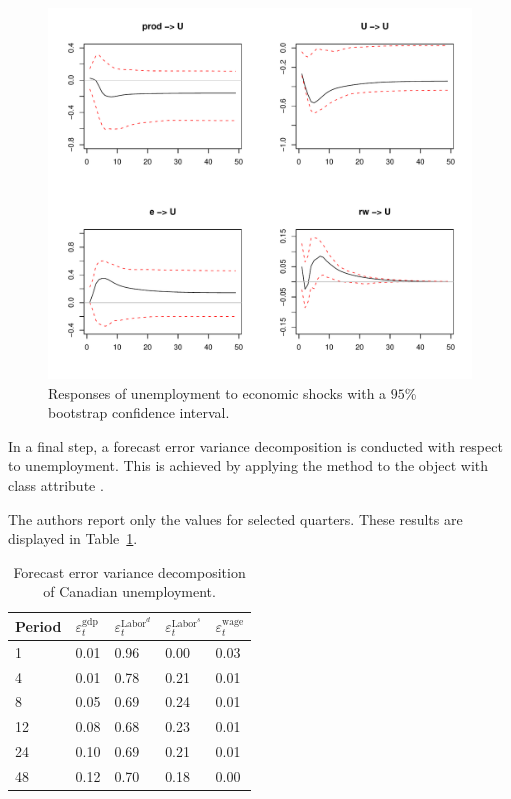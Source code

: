 \documentclass[nojss]{jss}
\begin{document}
\begin{figure}[t!]
\centering  
\includegraphics{Figures/fig-5}
\caption{Responses of unemployment to economic shocks with a $95$\%
  bootstrap confidence interval.}
\label{fig-5}
\end{figure}

In a final step, a forecast error variance decomposition is conducted
with respect to unemployment. This is achieved by applying the
 method to the object with class attribute .
\begin{Schunk}
\end{Schunk}
The authors report only the values for selected quarters. These
results are displayed in Table~\ref{tab-8}.
\begin{table}
\begin{center}
\begin{tabular}{@{}lllll@{}}
\toprule
\multicolumn{1}{l}{Period}&
\multicolumn{1}{l}{$\varepsilon_t^{\mathrm{gdp}}$}&
\multicolumn{1}{l}{$\varepsilon_t^{\mathrm{Labor}^d}$}&
\multicolumn{1}{l}{$\varepsilon_t^{\mathrm{Labor}^s}$}&
\multicolumn{1}{l}{$\varepsilon_t^{\mathrm{wage}}$}
\\
\midrule    
1 & 0.01 & 0.96 & 0.00 & 
0.03\\
4 & 0.01 & 0.78 & 0.21 & 
0.01\\
8 & 0.05 & 0.69 & 0.24 & 
0.01\\
12 & 0.08 & 0.68 & 0.23 & 
0.01\\
24 & 0.10 & 0.69 & 0.21 & 
0.01\\
48 & 0.12 & 0.70 & 0.18 & 
0.00\\
\bottomrule
\end{tabular}
\end{center}
\caption{Forecast error variance decomposition of Canadian unemployment.}
\label{tab-8}
\end{table}
\newpage
\end{document}
